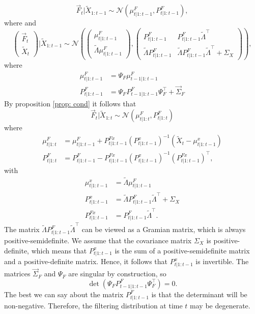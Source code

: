 \begin{equation}
	\vec{F}_{t} | \tilde{X}_{1:t-1} \sim \mathcal N \left( \mu_{t | 1:t-1}^{F}, P_{t | 1:t-1}^F \right),
\end{equation}
where 
and 
\begin{equation}
	\begin{pmatrix} \vec{F}_{t} \\ \tilde{X}_{t} \end{pmatrix} | \tilde{X}_{1:t-1} \sim 
	\mathcal N \left( 
		\begin{pmatrix} \mu_{t | 1:t-1}^{F} \\ \tilde{\Lambda} \mu_{t | 1:t-1}^F \end{pmatrix},
		\begin{pmatrix} 
			P_{t | 1:t-1}^F & P_{t | 1:t-1}^F \tilde{\Lambda}^{\top} \\ 
			\tilde{\Lambda} P_{t | 1:t-1}^F & \tilde{\Lambda} P_{t | 1:t-1}^F \tilde{\Lambda}^{\top} + \Sigma_X
		\end{pmatrix} 
	\right),
\end{equation}
where
\begin{align*}
	\mu_{t | 1:t-1}^F &= \Psi_{F} \mu_{t-1 | 1:t-1}^F \\
	P_{t | 1:t-1}^F &=  \Psi_{F} P_{t-1 | 1:t-1}^F \Psi_{F}^{\top} + \vec{\Sigma}_F
\end{align*}
By proposition \ref{prop: cond} it follows that 
\begin{equation}
	\vec{F}_{t} | \tilde{X}_{1:t} \sim \mathcal N (\mu_{t | 1:t}^F, P_{t | 1:t}^F)	
\end{equation}
where
\begin{equation}
	\begin{aligned}
		\mu_{t | 1:t}^F &= \mu_{t | 1:t-1}^F + P_{t | 1:t-1}^{Fx} \left( P_{t | 1:t-1}^x \right)^{-1} \left( \tilde{X}_{t} - \mu_{t | 1:t-1}^x \right) \\
		P_{t | 1:t}^F &= P_{t | 1:t-1}^F - P_{t | 1:t-1}^{Fx} \left( P_{t | 1:t-1}^x \right)^{-1} \left( P_{t | 1:t-1}^{Fx} \right)^{\top},
	\end{aligned}
\end{equation}
with
\begin{align*}
	\mu_{t | 1:t-1}^x &= \tilde{\Lambda} \mu_{t | 1:t-1}^F \\
	P_{t | 1:t-1}^x &= \tilde{\Lambda} P_{t | 1:t-1}^F \tilde{\Lambda}^{\top} + \Sigma_X \\
	P_{t | 1:t-1}^{Fx} &= P_{t | 1:t-1}^F \tilde{\Lambda}^{\top}.
\end{align*}
The matrix $\tilde{\Lambda} P_{t | 1:t-1}^F \tilde{\Lambda}^{\top}$ can be viewed as a Gramian matrix, which is always positive-semidefinite. We assume that the covariance matrix $\Sigma_X$ is positive-definite, which means that $P_{t | 1:t-1}^x$ is the sum of a positive-semidefinite matrix and a positive-definite matrix. Hence, it follows that $P_{t | 1:t-1}^x$ is invertible. The matrices $\vec{\Sigma}_F$ and $\Psi_{F}$ are singular by construction, so $$\det \left( \Psi_{F} P_{t-1 | 1:t-1}^F \Psi_{F}^{\top} \right) = 0.$$ The best we can say about the matrix $P_{t | 1:t-1}^F$ is that the determinant will be non-negative. Therefore, the filtering distribution at time $t$ may be degenerate. 


